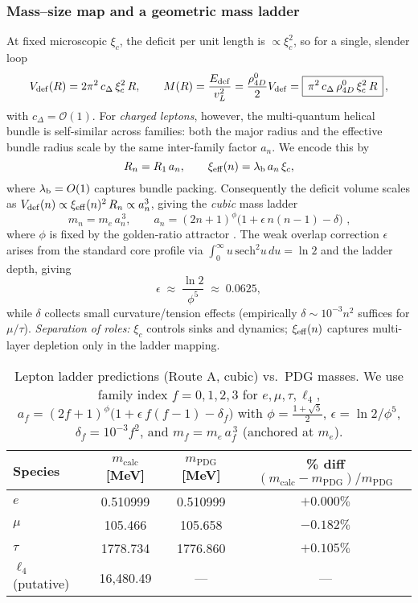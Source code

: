 \subsubsection{Mass--size map and a geometric mass ladder}
At fixed microscopic \(\xi_c\), the deficit per unit length is \( \propto \xi_c^2\), so for a single, slender loop
\begin{equation}
V_{\rm def}(R)=2\pi^2\,c_\Delta\,\xi_c^2\,R,\qquad
M(R)=\frac{E_{\rm def}}{v_L^2}=\frac{\rho_{4D}^0}{2}V_{\rm def}
=\boxed{\,\pi^2\,c_\Delta\,\rho_{4D}^0\,\xi_c^2\,R\,}\,,
\label{eq:MR}
\end{equation}
with \(c_\Delta=\mathcal O(1)\). 
For \emph{charged leptons}, however, the multi-quantum helical bundle is self-similar across families: both the major radius and the effective bundle radius scale by the same inter-family factor \(a_n\). We encode this by
\[
R_n=R_1\,a_n,\qquad \xi_{\rm eff}(n)=\lambda_{\rm b}\,a_n\,\xi_c,
\]
where \(\lambda_{\rm b}=O(1)\) captures bundle packing. Consequently the deficit volume scales as
\(V_{\rm def}(n)\propto \xi_{\rm eff}(n)^2\,R_n\propto a_n^3\), giving the \emph{cubic} mass ladder
\begin{equation}
\boxed{\,m_n=m_e\,a_n^{\,3},\qquad
a_n=(2n+1)^{\phi}\Big(1+\epsilon\,n(n\!-\!1)-\delta\Big)\,}\,,
\label{eq:ladder}
\end{equation}
where \(\phi\) is fixed by the golden-ratio attractor \cite{Norris2025GoldenRatio}. The weak overlap correction \(\epsilon\) arises from the standard core profile via \(\int_0^\infty u\,\mathrm{sech}^2 u\,du=\ln 2\) and the ladder depth, giving
\[
\epsilon\;\approx\;\frac{\ln 2}{\phi^5}\;\approx\;0.0625,
\]
while \(\delta\) collects small curvature/tension effects (empirically \(\delta\sim 10^{-3}n^2\) suffices for \(\mu/\tau\)). 
\emph{Separation of roles:} \(\xi_c\) controls sinks and dynamics; \(\xi_{\rm eff}(n)\) captures multi-layer depletion only in the ladder mapping.

\begin{table}[h]
\centering
\begin{tabular}{lccc}
\hline
Species & $m_{\text{calc}}$ [MeV] & $m_{\text{PDG}}$ [MeV] & \% diff $(m_{\text{calc}}-m_{\text{PDG}})/m_{\text{PDG}}$ \\
\hline
$e$         & 0.510999  & 0.510999  & $+0.000\%$ \\
$\mu$       & 105.466   & 105.658   & $-0.182\%$ \\
$\tau$      & 1778.734  & 1776.860  & $+0.105\%$ \\
$\ell_4$ (putative) & 16{,}480.49 & ---       & --- \\
\hline
\end{tabular}
\caption{Lepton ladder predictions (Route A, cubic) vs.\ PDG masses.
We use family index $f=0,1,2,3$ for $e,\mu,\tau,\ell_4$,
$a_f=(2f+1)^{\phi}\big(1+\epsilon\,f(f-1)-\delta_f\big)$ with
$\phi=\tfrac{1+\sqrt5}{2}$, $\epsilon=\ln 2/\phi^5$, $\delta_f=10^{-3}f^2$,
and $m_f=m_e\,a_f^{\,3}$ (anchored at $m_e$).}
\label{tab:lepton_ladder_vs_pdg}
\end{table}

